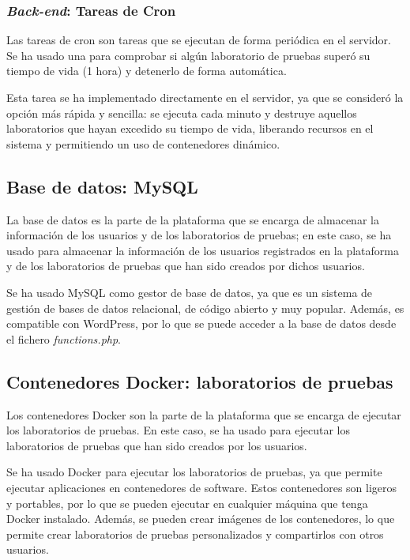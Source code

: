             \subsubsection{\textit{Back-end}: Tareas de Cron}

                Las tareas de cron son tareas que se ejecutan de forma periódica en el servidor. Se ha usado una para comprobar si algún laboratorio de pruebas superó su tiempo de vida (1 hora) y detenerlo de forma automática.
                
                Esta tarea se ha implementado directamente en el servidor, ya que se consideró la opción más rápida y sencilla: se ejecuta cada minuto y destruye aquellos laboratorios que hayan excedido su tiempo de vida, liberando recursos en el sistema y permitiendo un uso de contenedores dinámico.

        \subsection{Base de datos: MySQL}

            La base de datos es la parte de la plataforma que se encarga de almacenar la información de los usuarios y de los laboratorios de pruebas; en este caso, se ha usado para almacenar la información de los usuarios registrados en la plataforma y de los laboratorios de pruebas que han sido creados por dichos usuarios.
            
            Se ha usado MySQL como gestor de base de datos, ya que es un sistema de gestión de bases de datos relacional, de código abierto y muy popular. Además, es compatible con WordPress, por lo que se puede acceder a la base de datos desde el fichero \textit{functions.php}.
        
        \subsection{Contenedores Docker: laboratorios de pruebas}

            Los contenedores Docker son la parte de la plataforma que se encarga de ejecutar los laboratorios de pruebas. En este caso, se ha usado para ejecutar los laboratorios de pruebas que han sido creados por los usuarios.
            
            Se ha usado Docker para ejecutar los laboratorios de pruebas, ya que permite ejecutar aplicaciones en contenedores de software. Estos contenedores son ligeros y portables, por lo que se pueden ejecutar en cualquier máquina que tenga Docker instalado. Además, se pueden crear imágenes de los contenedores, lo que permite crear laboratorios de pruebas personalizados y compartirlos con otros usuarios.

